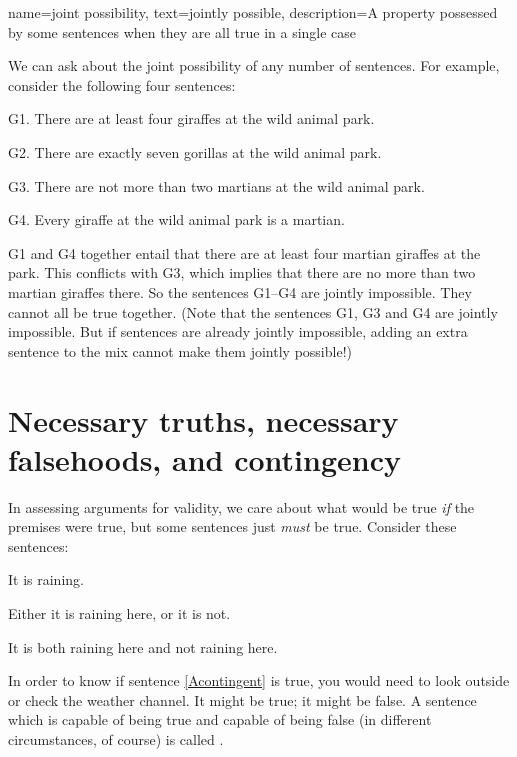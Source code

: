 {
name=joint possibility,
text={jointly possible},
description={A property possessed by some sentences when they are all true in a single case}
}

We can ask about the joint possibility of any number of sentences. For example, consider the following four sentences:
	\begin{ebullet}	
		\item[G1.] \label{MartianGiraffes} There are at least four giraffes at the wild animal park.
		\item[G2.] There are exactly seven gorillas at the wild animal park.
		\item[G3.] There are not more than two martians at the wild animal park.
		\item[G4.] Every giraffe at the wild animal park is a martian.
	\end{ebullet}
G1 and G4 together entail that there are at least four martian giraffes at the park. This conflicts with G3, which implies that there are no more than two martian giraffes there. So the sentences G1--G4 are jointly impossible. They cannot all be true together. (Note that the sentences G1, G3 and G4 are jointly impossible. But if sentences are already jointly impossible, adding an extra sentence to the mix cannot make them jointly possible!)

\section[Necessary truths and falsehoods]{Necessary truths, necessary falsehoods, and contingency}

In assessing arguments for validity, we care about what would be true \emph{if} the premises were true, but some sentences just \emph{must} be true. Consider these sentences:
	\begin{earg}
		\item[\ex{Acontingent}] It is raining.
		\item[\ex{Atautology}] Either it is raining here, or it is not.
		\item[\ex{Acontradiction}] It is both raining here and not raining here.
	\end{earg}
In order to know if sentence \ref{Acontingent} is true, you would need to look outside or check the weather channel. It might be true; it might be false. A sentence which is capable of being true and capable of being false (in different circumstances, of course) is called .

